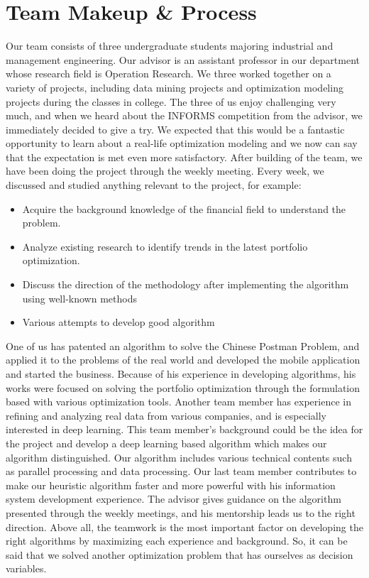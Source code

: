 \documentclass[11pt]{article}
\begin{document}
\section*{Team Makeup {\&} Process}

	Our team consists of three undergraduate students majoring industrial and management engineering. Our advisor is an assistant professor in our department whose research field is Operation Research. We three worked together on a variety of projects, including data mining projects and optimization modeling projects during the classes in college. The three of us enjoy challenging very much, and when we heard about the INFORMS competition from the advisor, we immediately decided to give a try. We expected that this would be a fantastic opportunity to learn about a real-life optimization modeling and we now can say that the expectation is met even more satisfactory.
	After building of the team, we have been doing the project through the weekly meeting. Every week, we discussed and studied anything relevant to the project, for example:
	\begin{itemize} 
		\item Acquire the background knowledge of the financial field to understand the problem.
		\item Analyze existing research to identify trends in the latest portfolio optimization.
		\item Discuss the direction of the methodology after implementing the algorithm using well-known methods
		\item Various attempts to develop good algorithm 
	\end{itemize}

	One of us has patented an algorithm to solve the Chinese Postman Problem, and applied it to the problems of the real world and developed the mobile application and started the business. Because of his experience in developing algorithms, his works were focused on solving the portfolio optimization through the formulation based with various optimization tools. Another team member has experience in refining and analyzing real data from various companies, and is especially interested in deep learning. This team member's background could be the idea for the project and develop a deep learning based algorithm which makes our algorithm distinguished. Our algorithm includes various technical contents such as parallel processing and data processing. Our last team member contributes to make our heuristic algorithm faster and more powerful with his information system development experience. The advisor gives guidance on the algorithm presented through the weekly meetings, and his mentorship leads us to the right direction. Above all, the teamwork is the most important factor on developing the right algorithms by maximizing each experience and background. So, it can be said that we solved another optimization problem that has ourselves as decision variables.
	
\end{document}

